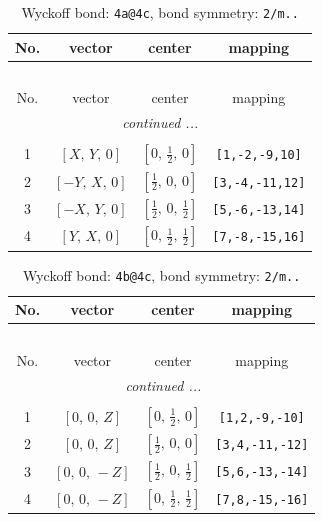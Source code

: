 \documentclass[fleqn,8pt]{jsarticle}
\begin{document}
\begin{longtable}{cccc}
\caption{Wyckoff bond: {\tt 4a@4c}, bond symmetry: {\tt 2/m..}}
 \\
 \hline \hline
No. & vector & center & mapping \\ \hline \endfirsthead

\multicolumn{3}{l}{\tablename\ \thetable{}} \\
 \hline \hline
No. & vector & center & mapping \\ \hline \endhead

 \hline \hline
\multicolumn{3}{r}{\footnotesize\it continued ...} \\ \endfoot

 \hline \hline
\multicolumn{3}{r}{} \\ \endlastfoot

1 & $\left[ X,\, Y,\, 0 \right]$ & $\left[ 0,\, \frac{1}{2},\, 0 \right]$ & {\tt [1,-2,-9,10]} \\ \hline
2 & $\left[ - Y,\, X,\, 0 \right]$ & $\left[ \frac{1}{2},\, 0,\, 0 \right]$ & {\tt [3,-4,-11,12]} \\ \hline
3 & $\left[ - X,\, Y,\, 0 \right]$ & $\left[ \frac{1}{2},\, 0,\, \frac{1}{2} \right]$ & {\tt [5,-6,-13,14]} \\ \hline
4 & $\left[ Y,\, X,\, 0 \right]$ & $\left[ 0,\, \frac{1}{2},\, \frac{1}{2} \right]$ & {\tt [7,-8,-15,16]} \\
\end{longtable}
\renewcommand{\arraystretch}{1.2}
\begin{longtable}{cccc}
\caption{Wyckoff bond: {\tt 4b@4c}, bond symmetry: {\tt 2/m..}}
 \\
 \hline \hline
No. & vector & center & mapping \\ \hline \endfirsthead

\multicolumn{3}{l}{\tablename\ \thetable{}} \\
 \hline \hline
No. & vector & center & mapping \\ \hline \endhead

 \hline \hline
\multicolumn{3}{r}{\footnotesize\it continued ...} \\ \endfoot

 \hline \hline
\multicolumn{3}{r}{} \\ \endlastfoot

1 & $\left[ 0,\, 0,\, Z \right]$ & $\left[ 0,\, \frac{1}{2},\, 0 \right]$ & {\tt [1,2,-9,-10]} \\ \hline
2 & $\left[ 0,\, 0,\, Z \right]$ & $\left[ \frac{1}{2},\, 0,\, 0 \right]$ & {\tt [3,4,-11,-12]} \\ \hline
3 & $\left[ 0,\, 0,\, - Z \right]$ & $\left[ \frac{1}{2},\, 0,\, \frac{1}{2} \right]$ & {\tt [5,6,-13,-14]} \\ \hline
4 & $\left[ 0,\, 0,\, - Z \right]$ & $\left[ 0,\, \frac{1}{2},\, \frac{1}{2} \right]$ & {\tt [7,8,-15,-16]} \\
\end{longtable}
\end{document}
